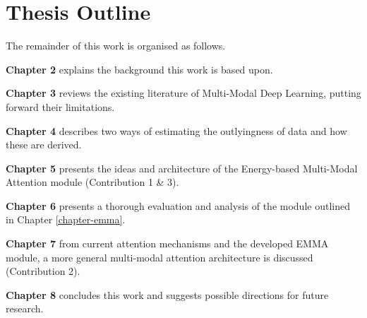 \section{Thesis Outline}
The remainder of this work is organised as follows.
\begin{description}
\item \textbf{Chapter 2} explains the background this work is based upon.
\item \textbf{Chapter 3} reviews the existing literature of Multi-Modal Deep Learning, putting forward their limitations.
\item \textbf{Chapter 4} describes two ways of estimating the outlyingness of data and how these are derived.
\item \textbf{Chapter 5} presents the ideas and architecture of the Energy-based Multi-Modal Attention module (Contribution 1 \& 3).
\item \textbf{Chapter 6} presents a thorough evaluation and analysis of the module outlined in Chapter \ref{chapter-emma}.
\item \textbf{Chapter 7} from current attention mechanisms and the developed EMMA module, a more general multi-modal attention architecture is discussed (Contribution 2).
\item \textbf{Chapter 8} concludes this work and suggests possible directions for future research.
\end{description}